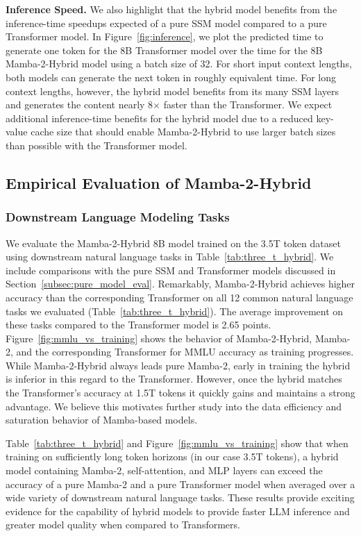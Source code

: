 \textbf{Inference Speed.} We also highlight that the hybrid model benefits from the inference-time speedups expected of a pure SSM model compared to a pure Transformer model. In Figure~\ref{fig:inference}, we plot the predicted time to generate one token for the 8B Transformer model over the time for the 8B Mamba-2-Hybrid model using a batch size of 32. For short input context lengths, both models can generate the next token in roughly equivalent time. For long context lengths, however, the hybrid model benefits from its many SSM layers and generates the content nearly 8$\times$ faster than the Transformer. We expect additional inference-time benefits for the hybrid model due to a reduced key-value cache size that should enable Mamba-2-Hybrid to use larger batch sizes than possible with the Transformer model.

\subsection{Empirical Evaluation of Mamba-2-Hybrid}
\subsubsection{Downstream Language Modeling Tasks}

We evaluate the Mamba-2-Hybrid 8B model trained on the 3.5T token dataset using downstream natural language tasks in Table~\ref{tab:three_t_hybrid}. We include comparisons with the pure SSM and Transformer models discussed in Section~\ref{subsec:pure_model_eval}. Remarkably, Mamba-2-Hybrid achieves higher accuracy than the corresponding Transformer on all 12 common natural language tasks we evaluated (Table~\ref{tab:three_t_hybrid}). The average improvement on these tasks compared to the Transformer model is 2.65 points.
Figure~\ref{fig:mmlu_vs_training} shows the behavior of Mamba-2-Hybrid, Mamba-2, and the corresponding Transformer for MMLU accuracy as training progresses. While Mamba-2-Hybrid always leads pure Mamba-2, early in training the hybrid is inferior in this regard to the Transformer. However, once the hybrid matches the Transformer's accuracy at 1.5T tokens it quickly gains and maintains a strong advantage. We believe this motivates further study into the data efficiency and saturation behavior of Mamba-based models.

Table~\ref{tab:three_t_hybrid} and Figure~\ref{fig:mmlu_vs_training} show that when training on sufficiently long token horizons (in our case 3.5T tokens), a hybrid model containing Mamba-2, self-attention, and MLP layers can exceed the accuracy of a pure Mamba-2 and a pure Transformer model when averaged over a wide variety of downstream natural language tasks. These results provide exciting evidence for the capability of hybrid models to provide faster LLM inference and greater model quality when compared to Transformers.

